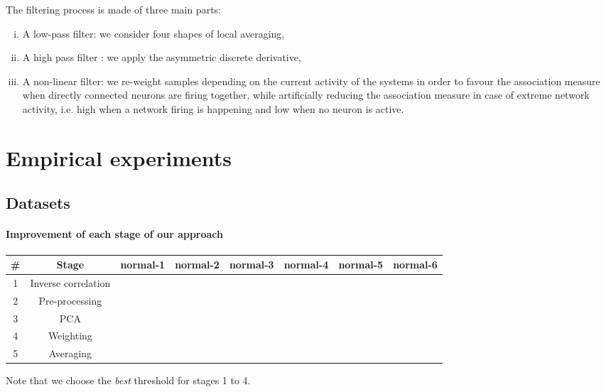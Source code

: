 \documentclass[wcp]{jmlr}
\begin{document}
The filtering process is made of three main parts:

\begin{enumerate}[i.]
\item A low-pass filter: we consider four shapes of local averaging, 
\item A high pass filter : we apply the asymmetric discrete derivative,
\item A non-linear filter: we re-weight samples depending on the current activity of the systems in order to favour the association measure when directly connected neurons are firing together, while artificially reducing the association measure in case of extreme network activity, i.e. high when a network firing is happening and low when no neuron is active.
\end{enumerate}

\section{Empirical experiments}
\subsection{Datasets}

\paragraph{Improvement of each stage of our approach\\}

\begin{table}[h!]
\begin{tabular}{|c|c||c|c|c|c|c|c|} \hline
\# & Stage & normal-1 & normal-2 & normal-3 & normal-4 & normal-5 & normal-6 \\ \hline
1 & Inverse correlation & & & & &  &  \\ \hline
2 & Pre-processing & & & & &  &  \\ \hline
3 & PCA & & & & &  &  \\ \hline
4 & Weighting & & & & &  &  \\ \hline
5 & Averaging & & & & &  &  \\ \hline

\end{tabular}
\end{table}

Note that we choose the \textit{best} threshold for stages 1 to 4. 
\end{document}
